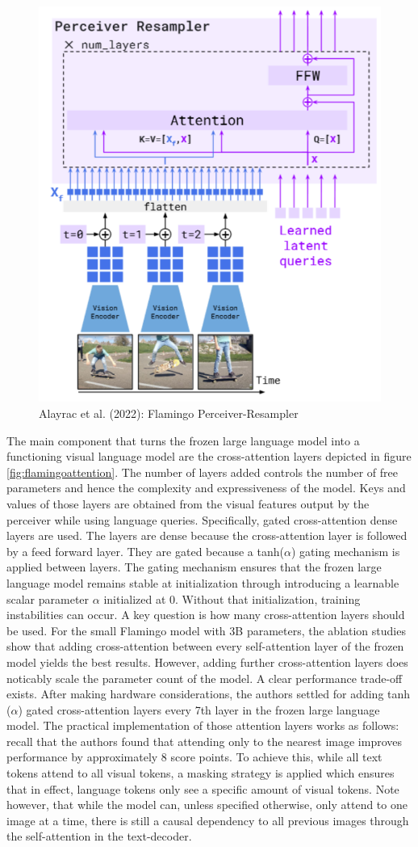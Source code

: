 \documentclass[
]{krantz}
\begin{document}
\begin{figure}

{\centering \includegraphics[width=0.5\linewidth]{figures/05-chapter2/perceiver} 

}

\caption{Alayrac et al. (2022): Flamingo Perceiver-Resampler}\label{fig:perceiver}
\end{figure}

The main component that turns the frozen large language model into a functioning visual language model are the cross-attention layers depicted in figure \ref{fig:flamingoattention}. The number of layers added controls the number of free parameters and hence
the complexity and expressiveness of the model. Keys and values of those layers are obtained from the visual features output by the perceiver while using language queries. Specifically, gated cross-attention dense layers are used. The layers are dense because the cross-attention layer is followed by a feed forward layer. They are gated because a tanh(\(\alpha\)) gating mechanism is applied between layers. The gating mechanism ensures that the frozen large language model remains stable at initialization through introducing a learnable scalar parameter \(\alpha\) initialized at 0. Without that initialization, training instabilities can occur.
A key question is how many cross-attention layers should be used. For the small Flamingo model with 3B parameters, the ablation studies show that adding cross-attention between every self-attention layer of the frozen model yields the best results.
However, adding further cross-attention layers does noticably scale the parameter count of the model. A clear performance trade-off exists. After making hardware considerations, the authors settled for adding tanh (\(\alpha\)) gated cross-attention layers every 7th layer in the frozen large language model.
The practical implementation of those attention layers works as follows: recall that the authors found that attending only to the nearest image improves performance by approximately 8 score points. To achieve this,
while all text tokens attend to all visual tokens, a masking strategy is applied which ensures that in effect, language tokens only see a specific amount of visual tokens. Note however, that while the model can, unless
specified otherwise, only attend to one image at a time, there is still a causal dependency to all previous images through the self-attention in the text-decoder.
\end{document}
